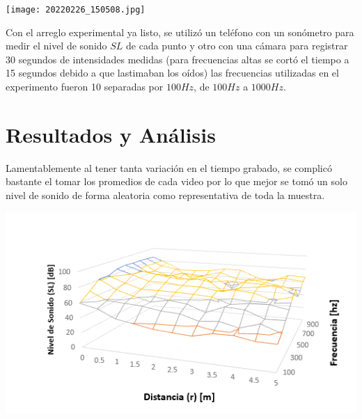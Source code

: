 \documentclass[DIV=calc, paper=a4, fontsize=11pt]{scrartcl}
\newenvironment{Figura}
  {\par\medskip\noindent\minipage{\linewidth}}
  {\endminipage\par\medskip}
\begin{document}
\begin{multicols}{2}
\begin{Figura}
\centering
    \texttt{[image: 20220226\_150508.jpg]}
    \label{fig}
\end{Figura}

Con el arreglo experimental ya listo, se utilizó un teléfono con un sonómetro para medir el nivel de sonido $SL$ de cada punto y otro con una cámara para registrar 30 segundos de intensidades medidas (para frecuencias altas se cortó el tiempo a 15 segundos debido a que lastimaban los oídos) las frecuencias utilizadas en el experimento fueron 10 separadas por $100Hz$, de $100 Hz$ a $1000 Hz$. 



\section*{Resultados y Análisis}

Lamentablemente al tener tanta variación en el tiempo grabado, se complicó bastante el tomar los promedios de cada video por lo que mejor se tomó un solo nivel de sonido de forma aleatoria como representativa de toda la muestra.

\begin{Figura}
\centering
    \includegraphics[width=1\textwidth]{grafica sonido 1.PNG}
    \label{fig}
\end{Figura}


\end{multicols}
\end{document}
